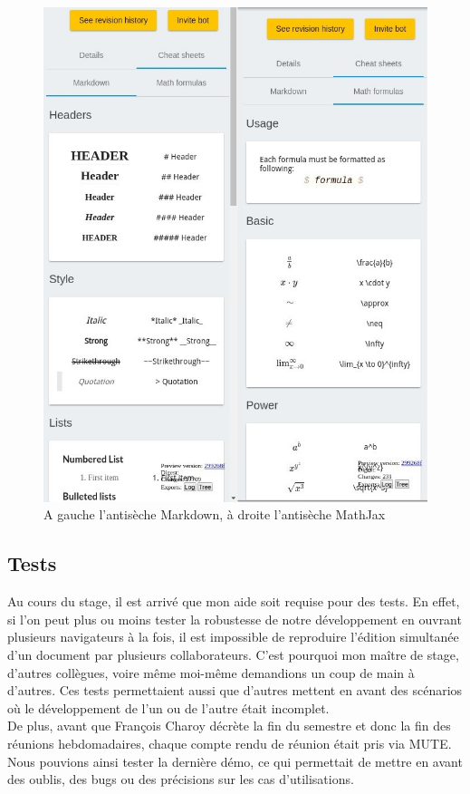 \documentclass[12pt]{article}
\begin{document}
\begin{figure}[H]
    \centering
    \includegraphics[scale=0.7]{gallery/cheat-sheets.jpg}
    \caption[nom dans le sommaire]{A gauche l'antisèche Markdown, à droite l'antisèche MathJax}
    \label{fig:gallery5}
\end{figure}


\newpage
\subsection{Tests}
Au cours du stage, il est arrivé que mon aide soit requise pour des tests. En effet, si l'on peut plus ou moins tester la robustesse de notre développement en ouvrant plusieurs navigateurs à la fois, il est impossible de reproduire l'édition simultanée d'un document par plusieurs collaborateurs. C'est pourquoi mon maître de stage, d'autres collègues, voire même moi-même demandions un coup de main à d'autres. Ces tests permettaient aussi que d'autres mettent en avant des scénarios où le développement de l'un ou de l'autre était incomplet.\\
De plus, avant que François Charoy décrète la fin du semestre et donc la fin des réunions hebdomadaires, chaque compte rendu de réunion était pris via MUTE. Nous pouvions ainsi tester la dernière démo, ce qui permettait de mettre en avant des oublis, des bugs ou des précisions sur les cas d'utilisations.\\
\end{document}
